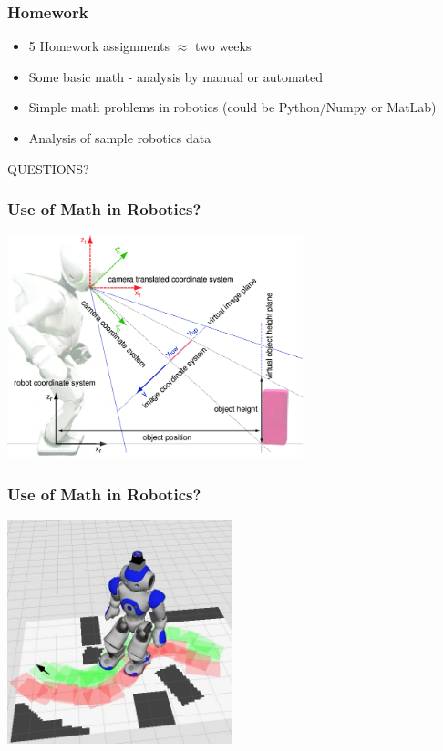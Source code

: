 \documentclass[10pt]{beamer}
\begin{document}
\begin{frame}
  \frametitle{Homework}
  \begin{itemize}
  \item 5 Homework assignments $\approx$ two weeks
  \item Some basic math - analysis by manual or automated
  \item Simple math problems in robotics (could be Python/Numpy or MatLab)
  \item Analysis of sample robotics data
  \end{itemize}
\end{frame}

\begin{frame}
  \centerline{\Huge QUESTIONS?}
\end{frame}


\begin{frame}
  \frametitle{Use of Math in Robotics? }
  \centerline{\includegraphics[height=6.5cm]{Computation-of-object-positions-on-the-ground-plane-size-estimation-and-the-involved.png}}
\end{frame}

\begin{frame}
  \frametitle{Use of Math in Robotics? }
  \centerline{\includegraphics[height=6.5cm]{plan_intro}}
\end{frame}
\end{document}
